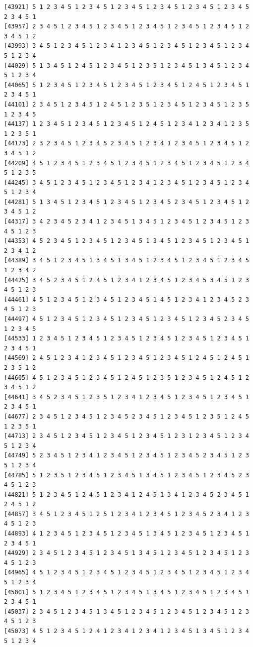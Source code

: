 \documentclass[
  english,
]{book}
\begin{document}
\begin{verbatim}
[43921] 5 1 2 3 4 5 1 2 3 4 5 1 2 3 4 5 1 2 3 4 5 1 2 3 4 5 1 2 3 4 5 2 3 4 5 1
[43957] 2 3 4 5 1 2 3 4 5 1 2 3 4 5 1 2 3 4 5 1 2 3 4 5 1 2 3 4 5 1 2 3 4 5 1 2
[43993] 3 4 5 1 2 3 4 5 1 2 3 4 1 2 3 4 5 1 2 3 4 5 1 2 3 4 5 1 2 3 4 5 1 2 3 4
[44029] 5 1 3 4 5 1 2 4 5 1 2 3 4 5 1 2 3 5 1 2 3 4 5 1 3 4 5 1 2 3 4 5 1 2 3 4
[44065] 5 1 2 3 4 5 1 2 3 4 5 1 2 3 4 5 1 2 3 4 5 1 2 4 5 1 2 3 4 5 1 2 3 4 5 1
[44101] 2 3 4 5 1 2 3 4 5 1 2 4 5 1 2 3 5 1 2 3 4 5 1 2 3 4 5 1 2 3 5 1 2 3 4 5
[44137] 1 2 3 4 5 1 2 3 4 5 1 2 3 4 5 1 2 4 5 1 2 3 4 1 2 3 4 1 2 3 5 1 2 3 5 1
[44173] 2 3 2 3 4 5 1 2 3 4 5 2 3 4 5 1 2 3 4 1 2 3 4 5 1 2 3 4 5 1 2 3 4 5 1 2
[44209] 4 5 1 2 3 4 5 1 2 3 4 5 1 2 3 4 5 1 2 3 4 5 1 2 3 4 5 1 2 3 4 5 1 2 3 5
[44245] 3 4 5 1 2 3 4 5 1 2 3 4 5 1 2 3 4 1 2 3 4 5 1 2 3 4 5 1 2 3 4 5 1 2 3 4
[44281] 5 1 3 4 5 1 2 3 4 5 1 2 3 4 5 1 2 3 4 5 2 3 4 5 1 2 3 4 5 1 2 3 4 5 1 2
[44317] 3 4 2 3 4 5 2 3 4 1 2 3 4 5 1 3 4 5 1 2 3 4 5 1 2 3 4 5 1 2 3 4 5 1 2 3
[44353] 4 5 2 3 4 5 1 2 3 4 5 1 2 3 4 5 1 3 4 5 1 2 3 4 5 1 2 3 4 5 1 2 3 4 1 2
[44389] 3 4 5 1 2 3 4 5 1 3 4 5 1 3 4 5 1 2 3 4 5 1 2 3 4 5 1 2 3 4 5 1 2 3 4 2
[44425] 3 4 5 2 3 4 5 1 2 4 5 1 2 3 4 1 2 3 4 5 1 2 3 4 5 3 4 5 1 2 3 4 5 1 2 3
[44461] 4 5 1 2 3 4 5 1 2 3 4 5 1 2 3 4 5 1 4 5 1 2 3 4 1 2 3 4 5 2 3 4 5 1 2 3
[44497] 4 5 1 2 3 4 5 1 2 3 4 5 1 2 3 4 5 1 2 3 4 5 1 2 3 4 5 2 3 4 5 1 2 3 4 5
[44533] 1 2 3 4 5 1 2 3 4 5 1 2 3 4 5 1 2 3 4 5 1 2 3 4 5 1 2 3 4 5 1 2 3 4 5 1
[44569] 2 4 5 1 2 3 4 1 2 3 4 5 1 2 3 4 5 1 2 3 4 5 1 2 4 5 1 2 4 5 1 2 3 5 1 2
[44605] 4 5 1 2 3 4 5 1 2 3 4 5 1 2 4 5 1 2 3 5 1 2 3 4 5 1 2 4 5 1 2 3 4 5 1 2
[44641] 3 4 5 2 3 4 5 1 2 3 5 1 2 3 4 1 2 3 4 5 1 2 3 4 5 1 2 3 4 5 1 2 3 4 5 1
[44677] 2 3 4 5 1 2 3 4 5 1 2 3 4 5 2 3 4 5 1 2 3 4 5 1 2 3 5 1 2 4 5 1 2 3 5 1
[44713] 2 3 4 5 1 2 3 4 5 1 2 3 4 5 1 2 3 4 5 1 2 3 1 2 3 4 5 1 2 3 4 5 1 2 3 4
[44749] 5 2 3 4 5 1 2 3 4 1 2 3 4 5 1 2 3 4 5 1 2 3 4 5 2 3 4 5 1 2 3 5 1 2 3 4
[44785] 5 1 2 3 5 1 2 3 4 5 1 2 3 4 5 1 3 4 5 1 2 3 4 5 1 2 3 4 5 2 3 4 5 1 2 3
[44821] 5 1 2 3 4 5 1 2 4 5 1 2 3 4 1 2 4 5 1 3 4 1 2 3 4 5 2 3 4 5 1 2 4 5 1 2
[44857] 3 4 5 1 2 3 4 5 1 2 5 1 2 3 4 1 2 3 4 5 1 2 3 4 5 2 3 4 1 2 3 4 5 1 2 3
[44893] 4 1 2 3 4 5 1 2 3 4 5 1 2 3 4 5 1 3 4 5 1 2 3 4 5 1 2 3 4 5 1 2 3 4 5 1
[44929] 2 3 4 5 1 2 3 4 5 1 2 3 4 5 1 3 4 5 1 2 3 4 5 1 2 3 4 5 1 2 3 4 5 1 2 3
[44965] 4 5 1 2 3 4 5 1 2 3 4 5 1 2 3 4 5 1 2 3 4 5 1 2 3 4 5 1 2 3 4 5 1 2 3 4
[45001] 5 1 2 3 4 5 1 2 3 4 5 1 2 3 4 5 1 3 4 5 1 2 3 4 5 1 2 3 4 5 1 2 3 4 5 1
[45037] 2 3 4 5 1 2 3 4 5 1 3 4 5 1 2 3 4 5 1 2 3 4 5 1 2 3 4 5 1 2 3 4 5 1 2 3
[45073] 4 5 1 2 3 4 5 1 2 4 1 2 3 4 1 2 3 4 1 2 3 4 5 1 3 4 5 1 2 3 4 5 1 2 3 4

\end{verbatim}
\end{document}
